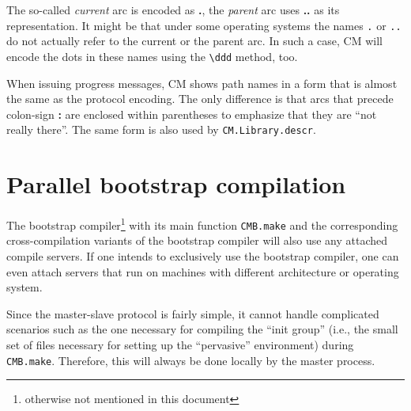 The so-called {\em current} arc is encoded as {\bf .}, the {\em
parent} arc uses {\bf ..} as its representation.  It might be that
under some operating systems the names {\tt .} or {\tt ..} do not
actually refer to the current or the parent arc.  In such a case, CM
will encode the dots in these names using the \verb|\ddd| method, too.

When issuing progress messages, CM shows path names in a form that is
almost the same as the protocol encoding.  The only difference is that
arcs that precede colon-sign {\bf :} are enclosed within parentheses
to emphasize that they are ``not really there''.  The same form is
also used by {\tt CM.Library.descr}.

\section{Parallel bootstrap compilation}

The bootstrap compiler\footnote{otherwise not mentioned in this
document} with its main function {\tt CMB.make} and the corresponding
cross-compilation variants of the bootstrap compiler will also use any
attached compile servers.  If one intends to exclusively use the
bootstrap compiler, one can even attach servers that run on machines
with different architecture or operating system.

Since the master-slave protocol is fairly simple, it cannot handle
complicated scenarios such as the one necessary for compiling the
``init group'' (i.e., the small set of files necessary for setting up
the ``pervasive'' environment) during {\tt CMB.make}.  Therefore, this
will always be done locally by the master process.
